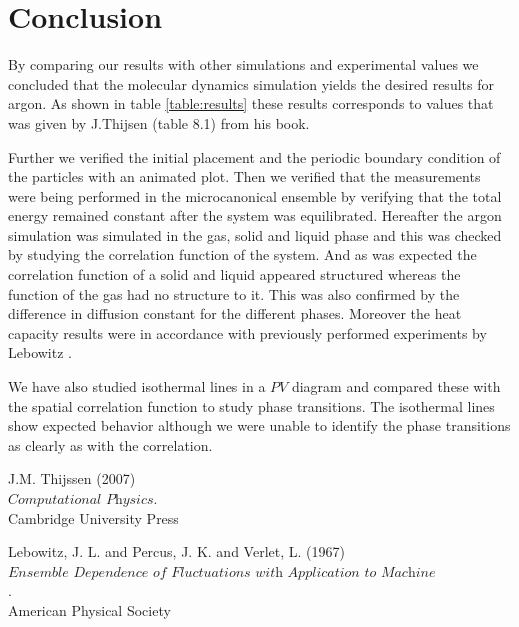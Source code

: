 \documentclass[12pt,a4paper]{report}
\begin{document}
\chapter{Conclusion}

By comparing our results with other simulations and experimental values we concluded that the molecular dynamics simulation yields the desired results for argon. As shown in table \ref{table:results} these results corresponds to values that was given by J.Thijsen \cite{thijssen} (table 8.1) from his book.

Further we verified the initial placement and the periodic boundary condition of the particles with an animated plot. Then we verified that the measurements were being performed in the microcanonical ensemble by verifying that the total energy remained constant after the system was equilibrated. Hereafter the argon simulation was simulated in the gas, solid and liquid phase and this was checked by studying the correlation function of the system. And as was expected the correlation function of a solid and liquid appeared structured whereas the function of the gas had no structure to it. This was also confirmed by the difference in diffusion constant for the different phases. Moreover the heat capacity results were in accordance with previously performed experiments by Lebowitz \cite{lebowitz1967}. 

We have also studied isothermal lines in a $PV$ diagram and compared these with the spatial correlation function to study phase transitions. The isothermal lines show expected behavior although we were unable to identify the phase transitions as clearly as with the correlation.

\newpage
\begin{thebibliography}{9}

 J.M. Thijssen (2007)\\
 $\textit{Computational Physics}$.\\
 Cambridge University Press
 
 Lebowitz, J. L. and Percus, J. K. and Verlet, L. (1967)\\
 $\textit{Ensemble Dependence of Fluctuations with Application to Machine Computations}$.\\
 American Physical Society
 \end{thebibliography}
\end{document}
